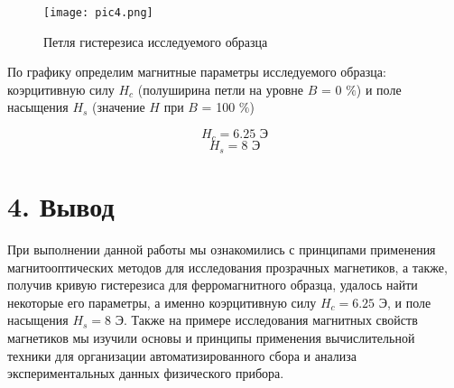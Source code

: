 \documentclass[a4paper,12pt]{report}
\begin{document}
\begin{figure}[H]
    \centering
    \texttt{[image: pic4.png]} \label{exp}
    \caption{Петля гистерезиса исследуемого образца}
\end{figure}

По графику определим магнитные параметры исследуемого образца: коэрцитивную силу $H_{c}$ (полуширина петли на уровне $B$ = 0 $\%$) и поле насыщения $H_{s}$ (значение $H$ при $B$ = 100 $\%$)
 
 \begin{equation*}
     H_{c} = 6.25 \text{ Э}
 \end{equation*}
 \begin{equation*}
     H_{s} = 8 \text{ Э}
 \end{equation*}
 
\section*{4. Вывод}
При выполнении данной работы мы ознакомились с принципами применения магнитооптических методов для исследования прозрачных магнетиков, а также, получив кривую гистерезиса для ферромагнитного образца, удалось найти некоторые его параметры, а именно коэрцитивную силу $H_{c} = 6.25$ Э, и поле насыщения $H_{s} = 8$ Э. Также на примере исследования магнитных свойств магнетиков мы изучили основы и принципы применения вычислительной техники для организации автоматизированного сбора и анализа экспериментальных данных физического прибора.
\end{document}
